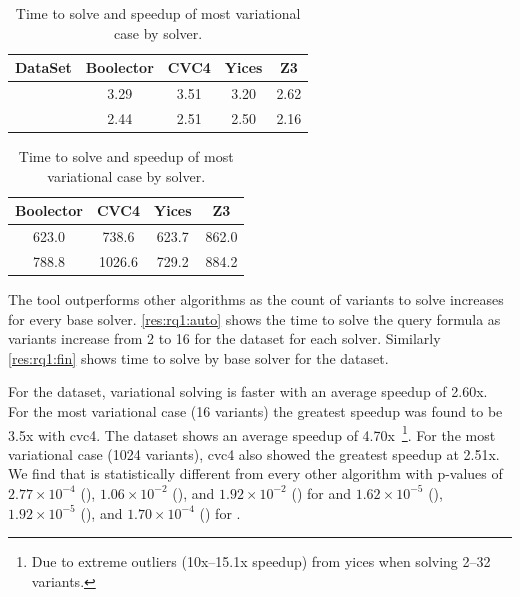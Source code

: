 \begin{table}
  \begin{subtable}[t]{0.45\textwidth}
    \centering
    \begin{tabular}{c || c | c | c | c}
      DataSet    & Boolector & CVC4 & Yices & Z3 \\
      \hline
      \auto{}    & 3.29      & 3.51 & 3.20  & 2.62 \\
      \fin{}     & 2.44      & 2.51 & 2.50  & 2.16 \\
    \end{tabular}
    \caption{Speedup by solver for the most variational case; 16 variants for
      \auto{}, 1024 for \fin{}.}%
    \label{tab:rq1:speedup}
  \end{subtable}
  \hfill
  \begin{subtable}[t]{0.45\textwidth}
    \centering
    \begin{tabular}{ c | c | c | c}
      Boolector & CVC4 & Yices & Z3 \\
      \hline
       623.0    & 738.6 & 623.7 & 862.0 \\
       788.8     & 1026.6 & 729.2  & 884.2 \\
    \end{tabular}
    \caption{Time [s] to solve with \vTov{} by solver.}%
    \label{tab:rq1:comparison}
  \end{subtable}
  \caption{Time to solve and speedup of most variational case by solver.}%
  \label{tab:rq1}
\end{table}

The \vsat{} tool outperforms other algorithms as the count of variants to solve
increases for every base solver. \autoref{res:rq1:auto} shows the time to solve
the query formula as variants increase from 2 to 16 for the \auto{} dataset for
each solver. Similarly \autoref{res:rq1:fin} shows time to solve by base solver
for the \fin{} dataset.

For the \auto{} dataset, variational solving is faster with an average speedup
of 2.60x. For the most variational case (16 variants) the greatest speedup was
found to be 3.5x with cvc4. The \fin{} dataset shows an average speedup of
4.70x~\footnote{Due to extreme outliers (10x--15.1x speedup) from yices when
  solving 2--32 variants.}. For the most variational case (1024 variants), cvc4
also showed the greatest speedup at 2.51x. We find that \vTov{} is statistically
different from every other algorithm with p-values of $2.77\times 10^{-4}$
(\vTop{}), $1.06\times 10^{-2}$ (\pTop{}), and $1.92\times 10^{-2}$ (\pTov{})
for \auto{} and $1.62\times 10^{-5}$ (\vTop{}), $1.92\times 10^{-5}$ (\pTop{}),
and $1.70\times 10^{-4}$ (\pTov{}) for \fin{}.

